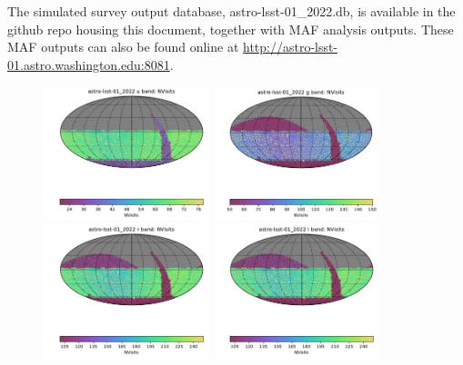 \documentclass[DM,lsstdraft,authoryear,toc]{lsstdoc}
\begin{document}
The simulated survey output database, astro-lsst-01\_2022.db, is available in the github repo housing this document, together with MAF analysis outputs. These MAF outputs can also be found online at \url{http://astro-lsst-01.astro.washington.edu:8081}.


\clearpage
\clearpage

\begin{figure}[ht]
\centering
\includegraphics[width=0.43\textwidth]{figures/astro-lsst-01_2022_NVisits_u_band_HEAL_SkyMap}
\includegraphics[width=0.43\textwidth]{figures/astro-lsst-01_2022_NVisits_g_band_HEAL_SkyMap} \\
\includegraphics[width=0.43\textwidth]{figures/astro-lsst-01_2022_NVisits_r_band_HEAL_SkyMap}
\includegraphics[width=0.43\textwidth]{figures/astro-lsst-01_2022_NVisits_i_band_HEAL_SkyMap} \\

\end{figure}
\end{document}
